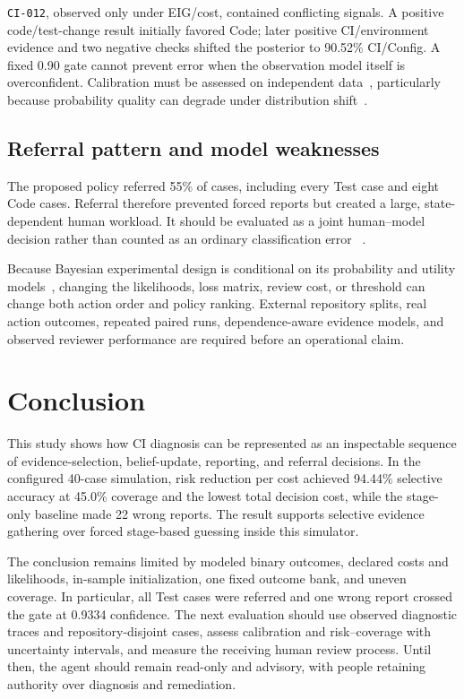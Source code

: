 \documentclass{article}
\begin{document}
\texttt{CI-012}, observed only under EIG/cost, contained conflicting signals.
A positive code/test-change result initially favored Code; later positive
CI/environment evidence and two negative checks shifted the posterior to
90.52\% CI/Config. A fixed 0.90 gate cannot prevent error when the observation
model itself is overconfident. Calibration must be assessed on independent
data~\cite{Guo2017Calibration}, particularly because probability quality can
degrade under distribution shift~\cite{Ovadia2019UncertaintyShift}.

\subsection{Referral pattern and model weaknesses}

The proposed policy referred 55\% of cases, including every Test case and
eight Code cases. Referral therefore prevented forced reports but created a
large, state-dependent human workload. It should be evaluated as a joint
human--model decision rather than counted as an ordinary classification error
~\cite{Mozannar2020Defer}.

Because Bayesian experimental design is conditional on its probability and
utility models~\cite{Rainforth2024ExperimentalDesign}, changing the
likelihoods, loss matrix, review cost, or threshold can change both action
order and policy ranking. External repository splits, real action outcomes,
repeated paired runs, dependence-aware evidence models, and observed reviewer
performance are required before an operational claim.

\section{Conclusion}
\label{sec:conclusion}

This study shows how CI diagnosis can be represented as an inspectable sequence
of evidence-selection, belief-update, reporting, and referral decisions. In the
configured 40-case simulation, risk reduction per cost achieved 94.44\%
selective accuracy at 45.0\% coverage and the lowest total decision cost, while
the stage-only baseline made 22 wrong reports. The result supports selective
evidence gathering over forced stage-based guessing inside this simulator.

The conclusion remains limited by modeled binary outcomes, declared costs and
likelihoods, in-sample initialization, one fixed outcome bank, and uneven
coverage. In particular, all Test cases were referred and one wrong report
crossed the gate at 0.9334 confidence. The next evaluation should use observed
diagnostic traces and repository-disjoint cases, assess calibration and
risk--coverage with uncertainty intervals, and measure the receiving human
review process. Until then, the agent should remain read-only and advisory,
with people retaining authority over diagnosis and remediation.



\end{document}
